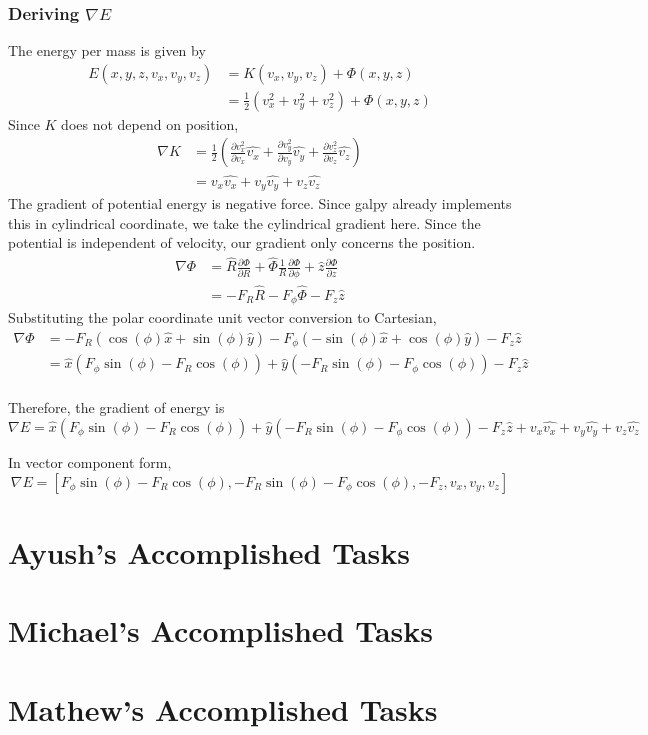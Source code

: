 \documentclass[12pt]{article}
\begin{document}
\subsubsection{Deriving $\nabla E$}
The energy per mass is given by 
\begin{align*}
E(x,y,z,v_x,v_y,v_z) &= K(v_x,v_y,v_z) + \Phi(x,y,z) \\
&= \frac{1}{2}(v_x^2 + v_y^2 + v_z^2) + \Phi(x,y,z)
\end{align*}
Since $K$ does not depend on position,
\begin{align*}
\nabla K &= \frac{1}{2}(\frac{\partial v_x^2}{\partial v_x} \hat{v_x} +\frac{\partial v_y^2}{\partial v_y}\hat{v_y} + \frac{\partial v_z^2}{\partial v_z} \hat{v_z}) \\
&= v_x \hat{v_x} + v_y \hat{v_y} + v_z \hat{v_z} 
\end{align*}
The gradient of potential energy is negative force. Since galpy already implements this in cylindrical coordinate, we take the cylindrical gradient here. Since the potential is independent of velocity, our gradient only concerns the position.
\begin{align*}
 \nabla \Phi &= \hat{R} \frac{\partial \Phi}{\partial R} + \hat{\Phi} \frac{1}{R}\frac{\partial \Phi}{\partial \phi} + \hat{z}\frac{\partial \Phi}{\partial z} \\
&= - F_R \hat{R}  -F_{\phi} \hat{\Phi} - F_z \hat{z}
\end{align*}
Substituting the polar coordinate unit vector conversion to Cartesian,
\begin{align*}
 \nabla \Phi &= - F_R (\cos(\phi) \hat{x} + \sin(\phi) \hat{y})  -F_{\phi} (- \sin(\phi) \hat{x} + \cos(\phi) \hat{y}) - F_z \hat{z} \\
 &= \hat{x}(F_{\phi} \sin(\phi)- F_R \cos(\phi)) + \hat{y}(- F_R \sin(\phi) -F_{\phi} \cos(\phi)) - F_z \hat{z} \\
\end{align*}

Therefore, the gradient of energy is
$$ \nabla E =  \hat{x}(F_{\phi} \sin(\phi)- F_R \cos(\phi)) + \hat{y}(- F_R \sin(\phi) -F_{\phi} \cos(\phi)) - F_z \hat{z} + v_x \hat{v_x} + v_y \hat{v_y} + v_z \hat{v_z} $$

In vector component form, 
$$ \nabla E = [F_{\phi} \sin(\phi)- F_R \cos(\phi),- F_R \sin(\phi) -F_{\phi} \cos(\phi), - F_z ,v_x, v_y, v_z ] $$

\section{Ayush’s Accomplished Tasks}


\section{Michael's Accomplished Tasks}


\section{Mathew's Accomplished Tasks}
\end{document}
